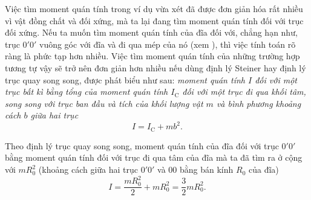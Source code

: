 Việc tìm moment quán tính trong ví dụ vừa xét đã được đơn giản hóa rất nhiều vì vật đồng chất và đối xứng, mà ta lại đang tìm moment quán tính đối với trục đối xứng. Nếu ta muốn tìm moment quán tính của đĩa đối với, chẳng hạn như, trục $0'0'$ vuông góc với đĩa và đi qua mép của nó (xem ), thì việc tính toán rõ ràng là phức tạp hơn nhiều. Việc tìm moment quán tính của những trường hợp tương tự vậy sẽ trở nên đơn giản hơn nhiều nếu dùng định lý Steiner hay định lý trục quay song song, được phát biểu như sau: \textit{moment quán tính $I$ đối với một trục bất kì bằng tổng của moment quán tính $I_{\text{C}}$ đối với một trục đi qua khối tâm, song song với trục ban đầu và tích của khối lượng vật $m$ và bình phương khoảng cách $b$ giữa hai trục}
\begin{equation}\label{eq:5_23}
I = I_{\text{C}}+ mb^2.
\end{equation}

Theo định lý trục quay song song, moment quán tính của đĩa đối với trục $0'0'$ bằng moment quán tính đối với trục đi qua tâm của đĩa mà ta đã tìm ra ở  cộng với $mR_0^2$ (khoảng cách giữa hai trục $0'0'$ và $00$ bằng bán kính $R_0$ của đĩa)
\begin{equation*}
I = \frac{mR^2_0}{2} + mR_0^2 = \frac{3}{2}mR_0^2.
\end{equation*}

